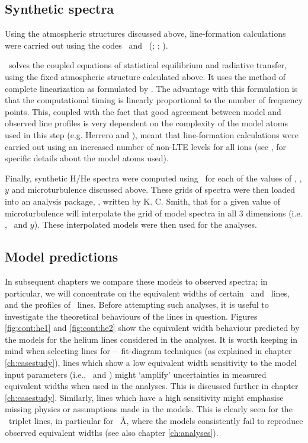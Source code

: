 \subsection{Synthetic spectra}

Using the atmospheric structures discussed above, line-formation
calculations were carried out using the codes \detail\ and
\surface\ (\cite{gi:81}; \cite{bu:84}; \cite{bu:85}).

\detail\ solves the coupled equations of statistical equilibrium and
radiative transfer, using the fixed atmospheric structure
calculated above. It uses the method of complete linearization as
formulated by . The advantage with this formulation is
that the computational timing is linearly proportional to the number
of frequency points. This, coupled with the fact that good agreement
between model and observed line profiles is very dependent on the
complexity of the model atoms used in this step (e.g. Herrero
\cite*{he:87hyd} and \cite*{he:87he}), meant that line-formation
calculations were carried out using an increased number of non-LTE
levels for all ions (see \cite{sm:94}, for specific details about the
model atoms used).

Finally, synthetic H/He spectra were computed using \surface\ for each
of the values of \teff, \logg, $y$ and microturbulence discussed
above. These grids of spectra were then loaded into an analysis package,
, written by K. C. Smith, that for a given value of
microturbulence will interpolate the grid of model spectra in all 3
dimensions (i.e. \teff,
\logg\ and $y$). These interpolated models were then used for the
analyses.

\subsection{Model predictions}

In subsequent chapters we compare these models to observed spectra; in
particular, we will concentrate on the equivalent widths of certain
\hei\ and \heii\ lines, and the profiles of \hi\
lines. Before attempting such analyses, it is useful to investigate the
theoretical behaviours of the lines in question. Figures
\ref{fig:cont:he1} and \ref{fig:cont:he2} show the equivalent width
behaviour predicted by the models for the helium lines considered in
the analyses. It is worth keeping in mind when selecting lines for
\teff--\logg\ fit-diagram techniques (as explained in chapter
\ref{ch:casestudy}), lines which show a low equivalent width
sensitivity to the model input parameters (i.e., \teff\ and \logg)
might `amplify' uncertainties in measured equivalent widths when used
in the analyses. This is discussed further in chapter
\ref{ch:casestudy}. Similarly, lines which have a high sensitivity
might emphasise missing physics or assumptions made in the
models. This is clearly seen for the \hei\ triplet lines, in
particular for \hei\ \AA, where the models consistently fail
to reproduce observed equivalent widths (see also chapter \ref{ch:analyses}).

